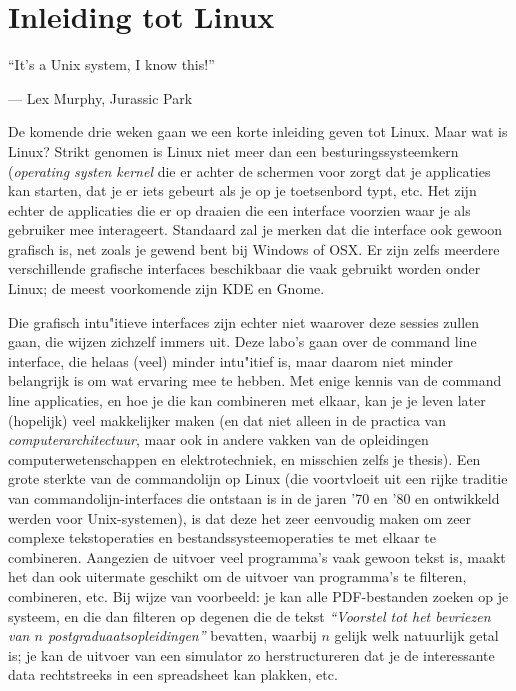 \documentclass[a4paper,twoside,openany]{memoir}
\begin{document}
\epigraphfontsize{\small\itshape}

\chapter{Inleiding tot Linux}
\epigraph{``It’s a Unix system, I know this!''}{--- \textup{Lex Murphy}, Jurassic Park}

De komende drie weken gaan we een korte inleiding geven tot Linux. Maar wat is Linux? Strikt genomen is Linux
niet meer dan een besturingssysteemkern (\emph{operating systen kernel} die er achter de schermen voor zorgt dat je applicaties kan starten, dat je
er iets gebeurt als je op je toetsenbord typt, etc. Het zijn echter de applicaties die er op draaien die een interface voorzien waar je als gebruiker mee interageert.
Standaard zal je merken dat die interface ook gewoon grafisch is, net zoals je gewend bent bij Windows of OSX. Er zijn zelfs meerdere verschillende grafische interfaces
beschikbaar die vaak gebruikt worden onder Linux; de meest voorkomende zijn KDE en Gnome.

Die grafisch intu"itieve interfaces zijn echter niet waarover deze sessies zullen gaan, die wijzen zichzelf immers uit. Deze labo's gaan over
de command line interface, die helaas (veel) minder intu"itief is, maar daarom niet minder belangrijk is om wat ervaring mee te hebben. Met enige kennis van de command
line applicaties, en hoe je die kan combineren met elkaar, kan je je leven later (hopelijk) veel makkelijker maken (en dat niet alleen in de practica van \emph{computerarchitectuur},
maar ook in andere vakken van de opleidingen computerwetenschappen en elektrotechniek, en misschien zelfs je thesis). Een grote sterkte van de commandolijn op Linux (die voortvloeit uit een rijke traditie van commandolijn-interfaces die ontstaan is in de jaren '70 en '80 en ontwikkeld werden voor Unix-systemen), is dat deze het zeer eenvoudig maken om zeer complexe tekstoperaties en bestandssysteemoperaties te met elkaar te combineren. Aangezien de uitvoer veel programma's vaak gewoon tekst is, maakt het dan ook uitermate geschikt om de uitvoer van programma's te filteren, combineren, etc. Bij wijze van voorbeeld: je kan alle PDF-bestanden zoeken op je systeem, en die dan filteren op degenen die de tekst \emph{``Voorstel tot het bevriezen van $n$ postgraduaatsopleidingen''} bevatten, waarbij $n$ gelijk welk natuurlijk getal is; je kan de uitvoer van een simulator zo herstructureren dat je de interessante data rechtstreeks in een spreadsheet kan plakken, etc.
\end{document}
